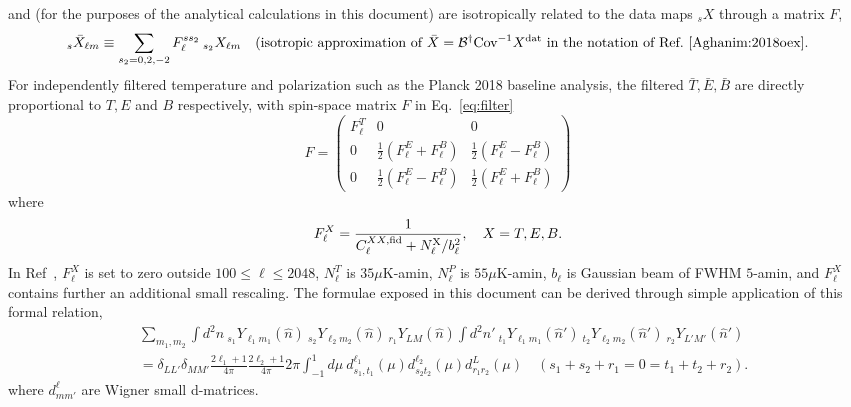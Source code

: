 \documentclass{article}
\newcommand{\Cov}[0]{{\textrm{Cov}}}
\newcommand{\hn}[0]{\hat n}
\begin{document}
and (for the purposes of the analytical calculations in this document) are isotropically related to the data maps $_sX$ through a matrix $F$,
\begin{equation}\label{eq:filter}
	_{s}\bar X_{\ell m} \equiv \sum_{s_2 = 0,2,-2}F_\ell^{s s_2} \:_{s_2}X_{\ell m} \quad \textrm{(isotropic approximation of } \bar X = \mathcal B^\dagger \Cov^{-1} X ^\textrm{\rm dat}\textrm{ in the notation of Ref.~\cite{Aghanim:2018oex}}.
\end{equation} 
For independently filtered temperature and polarization such as the Planck 2018 baseline analysis, the filtered $\bar T, \bar E, \bar B$ are directly proportional to $T, E$ and $B$ respectively, with spin-space matrix $F$ in Eq.~\eqref{eq:filter}
\begin{equation}
	F = \begin{pmatrix}
		F^T_\ell & 0 & 0 \\ 0 & \frac 12 \left( F^{E}_\ell  + F^{B}_\ell\right) & \frac 12 \left( F^{E}_\ell  - F^{B}_\ell\right) \\ 0& \frac 12 \left( F^{E}_\ell  - F^{B}_\ell\right) & \frac 12 \left( F^{E}_\ell  + F^{B}_\ell\right)
	\end{pmatrix}
\end{equation}
where
\begin{equation}
F_\ell^{X} = \frac{1}{C_\ell^{XX,\rm fid} + N_\ell^{\rm X} /b_\ell^2}, \quad X = T,E,B.
\end{equation}
In Ref~\cite{Aghanim:2018oex}, $F_\ell^{X}$ is set to zero outside $100 \le \ell \le 2048$, $N^T_\ell$ is $35 \mu$K-amin, $N^P_\ell$ is $55 \mu$K-amin, $b_\ell$ is Gaussian beam of FWHM $5$-amin, and $F_\ell^X$ contains further an additional small rescaling. 
\newline
\newline
The formulae exposed in this document can be derived through simple application of this formal relation,
\begin{equation}
\begin{split}
&\sum_{m_1,m_2}\int d^2n\:_{s_1} Y_{\ell_1 m_1}(\hn)\:_{s_2} Y_{\ell_2 m_2}(\hn)\:_{r_1} Y_{L M}(\hn)\int d^2n'\:_{t_1} Y_{\ell_1 m_1}(\hn')\:_{t_2} Y_{\ell_2 m_2}(\hn')\:_{r_2} Y_{L' M'}(\hn')  \\&= \delta_{LL'}\delta_{MM'}\frac{2\ell_1 + 1}{4\pi}\frac{2\ell_2 + 1} {4\pi} 2\pi \int_{-1}^{1} d\mu \: d^{\ell_1}_{s_1,t_1}(\mu)d^{\ell_2}_{s_2 t_2}(\mu)d^{L}_{r_1 r_2}(\mu) \quad (s_1 + s_2 + r_1  = 0 = t_1 + t_2 + r_2).
\end{split}
\end{equation}
where $d^\ell_{mm'}$ are Wigner small d-matrices.
\end{document}
